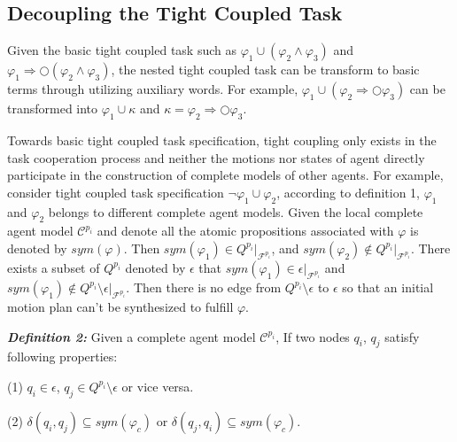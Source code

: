 \documentclass[journal]{IEEEtran}
\begin{document}
\subsection{Decoupling the Tight Coupled Task}
Given the basic tight coupled task such as $\varphi_1 \cup (\varphi_2 \wedge \varphi_3)$ and $\varphi_1 \Longrightarrow \bigcirc(\varphi_2 \wedge \varphi_3)$, the nested tight coupled task can be transform to basic terms through utilizing auxiliary words. For example, $\varphi_1 \cup (\varphi_2 \Longrightarrow \bigcirc \varphi_3)$ can be transformed into $\varphi_1 \cup \kappa$ and $\kappa=\varphi_2 \Longrightarrow \bigcirc \varphi_3$.
\par
Towards basic tight coupled task specification, tight coupling only exists in the task cooperation process and neither the motions nor states of agent directly participate in the construction of complete models of other agents. For example, consider tight coupled task specification $\neg \varphi_1\cup\varphi_2$, according to definition 1, $\varphi_1$ and $\varphi_2$ belongs to different complete agent models. Given the local complete agent model $\mathcal{C}^{p_i}$ and denote all the atomic propositions associated with $\varphi$ is denoted by $sym(\varphi)$. Then $sym(\varphi_1) \in Q^{p_i}|_{\mathcal{F}^{p_i}}$, and $sym(\varphi_2) \notin Q^{p_i}|_{\mathcal{F}^{p_i}} $. There exists a subset of $Q^{p_i}$ denoted by $\epsilon$ that $sym(\varphi_1) \in \epsilon |_{\mathcal{F}^{p_i}}$ and $sym(\varphi_1) \notin Q^{p_i} \setminus \epsilon |_{\mathcal{F}^{p_i}}$. Then there is no edge from $Q^{p_i} \setminus \epsilon$ to $\epsilon$ so that an initial motion plan can't be synthesized to fulfill $\varphi$.\par
\textbf{\emph{Definition 2:}} Given a complete agent model $\mathcal{C}^{p_i}$, If two nodes $q_i$, $q_j$ satisfy following properties:
\par
(1) $q_i \in \epsilon$, $q_j \in Q^{p_i} \setminus \epsilon$ or vice versa.\par
(2) $\delta(q_i,q_j)\subseteq sym(\varphi_c)$ or $\delta(q_j,q_i)\subseteq sym(\varphi_c)$.
\end{document}
